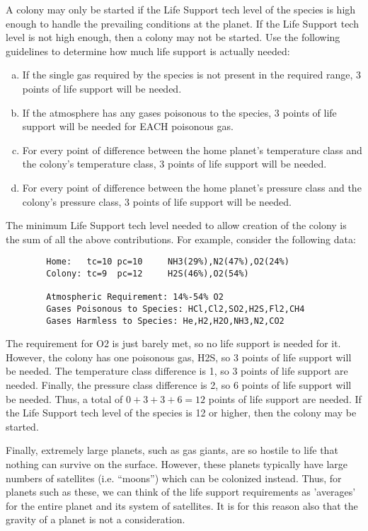 \documentclass[10pt,titlepage]{article}
\begin{document}
A colony may only be started if the Life Support tech level of the species is
high enough to handle the prevailing conditions at the planet.  If the Life
Support tech level is not high enough, then a colony may not be started.  Use
the following guidelines to determine how much life support is actually needed:
\begin{enumerate}[a.] 
     \item If the single gas required by the species is not present in
	the required range, 3 points of life support will be needed.

     \item If the atmosphere has any gases poisonous to the species,
	3 points of life support will be needed for EACH poisonous gas.

     \item For every point of difference between the home planet's temperature
	class and the colony's temperature class, 3 points of life support
	will be needed.

     \item For every point of difference between the home planet's pressure
	class and the colony's pressure class, 3 points of life support
	will be needed.
\end{enumerate}
The minimum Life Support tech level needed to allow creation of the colony is
the sum of all the above contributions.  For example, consider the following
data:

\begin{verbatim}
        Home:   tc=10 pc=10     NH3(29%),N2(47%),O2(24%)
        Colony: tc=9  pc=12     H2S(46%),O2(54%)

        Atmospheric Requirement: 14%-54% O2
        Gases Poisonous to Species: HCl,Cl2,SO2,H2S,Fl2,CH4
        Gases Harmless to Species: He,H2,H2O,NH3,N2,CO2
\end{verbatim} 

The requirement for O2 is just barely met, so no life support is needed for it.
However, the colony has one poisonous gas, H2S, so 3 points of life support
will be needed.  The temperature class difference is 1, so 3 points of life
support are needed.  Finally, the pressure class difference is 2, so 6 points
of life support will be needed.  Thus, a total of $0+3+3+6 = 12$ points of life
support are needed.  If the Life Support tech level of the species is 12 or
higher, then the colony may be started.

Finally, extremely large planets, such as gas giants, are so hostile to life
that nothing can survive on the surface.  However, these planets typically have
large numbers of satellites (i.e. ``moons'') which can be colonized instead.
Thus, for planets such as these, we can think of the life support requirements
as 'averages' for the entire planet and its system of satellites.  It is for
this reason also that the gravity of a planet is not a consideration.
\end{document}
